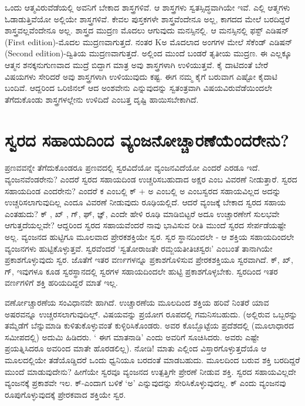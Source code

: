 ಒಂದು ಆತ್ಮವಿರುವೆಡೆಯಲ್ಲಿ ಅವನಿಗೆ ಬೇಕಾದ ಶಾಸ್ತ್ರಗಳಿವೆ. ಆ ಶಾಸ್ತ್ರಗಳು ಸ್ವತಸ್ಸಿದ್ಧವಾಗಿಯೇ ಇವೆ. ಎಲ್ಲಿ ಆತ್ಮಗಳು ಓಡಾಡುತ್ತಿವೆಯೋ ಅಲ್ಲಿಯೇ ಶಾಸ್ತ್ರಗಳಿವೆ. ಕೇವಲ ಪುಸ್ತಕಗಳೇ ಶಾಸ್ತ್ರವೆಂದೇನೂ ಅಲ್ಲ, ಕಾಗದದ ಮೇಲೆ ಬರದಿದ್ದರೆ ಶಾಸ್ತ್ರವಲ್ಲವೆಂದೇನೂ ಅಲ್ಲ. ಶಾಸ್ತ್ರದ ಮುದ್ರಣ ಮೊದಲು ಆಗುವುದು ಮನಸ್ಸಿನಲ್ಲಿ. ಆ ಮನಸ್ಸಿನಲ್ಲಿ ಫಸ್ಟ್  ಎಡಿಷನ್ (First edition)-ಮೊದಲ ಮುದ್ರಣವಾಗುತ್ತದೆ. ನಂತರ Kಅ ಮೊದಲಾದ ಅಂಗಗಳ ಮೇಲೆ ಸೆಕೆಂಡ್ ಎಡಿಷನ್ (Second edition)-ದ್ವಿತಿಯ ಮುದ್ರಣವಾಗುತ್ತದೆ. ಅಲ್ಲಿಂದ ಮುಂದೆ ಬಂಡರೆ ತೃತೀಯ ಮುದ್ರಣ. ಈ ಎಲ್ಲಕ್ಕೂ ಆತ್ಮನ ಶನಕ್ಕನುಗುಣವಾದ ಮುದ್ರೆ ಬಿದ್ದಾಗ ಮಾತ್ರ ಅವು ಶಾಸ್ತ್ರಗಳಾಗಿ ಉಳಿಯುತ್ತವೆ. ಕೈ ದಾಟಿದಂತೆ ಬೇರೆ ವಿಷಯಗಳು ಸೇರಿದರೆ ಅವು ಶಾಸ್ತ್ರಗಳಾಗಿ ಉಳಿಯುವುದು ಕಷ್ಟ. ಈಗ ನಮ್ಮ ಕೈಗೆ ಬರುವಾಗ ಎಷ್ಟೋ ಕೈದಾಟಿ ಬಂದಿವೆ. ಆದ್ದರಿಂದ ಒರಿಜಿನಲ್ ಆದ ಅಂಶವೇನು ಎನ್ನುವುದನ್ನು ಸ್ವತಂತ್ರವಾಗಿ ವಿಷಯವಿರುವೆಡೆಯಿಂದಲೇ ತೆಗೆದುಕೊಂಡು ಶಾಸ್ತ್ರಗಳಲ್ಲೇನು ಉಳಿದಿದೆ ಎಂಬತ್ತ ದೃಷ್ಟಿ ಹಾಯಿಸಬೇಕಾಗಿದೆ.

\section*{ಸ್ವರದ ಸಹಾಯದಿಂದ ವ್ಯಂಜನೋಚ್ಚಾರಣೆಯೆಂದರೇನು?}

ಪ್ರಣವವನ್ನೇ ತೆಗೆದುಕೊಂಡರೂ ಪ್ರಣವದಲ್ಲಿ ಸ್ವರವಿದೆಯೋ ವ್ಯಂಜನವಿದೆಯೋ ಎಂದರೆ ಎರಡೂ ಇದೆ. ವ್ಯಂಜನವೆಂಡರೇನು? ಎಂದರೆ ಸ್ವರದ ಸಹಾಯದಿಂಡ ಉಚ್ಚರಿಸಬಹುದಾದ ಅಕ್ಷರ ಎಂಬ ವಿವರಣೆ ನೀಡುತ್ತಾರೆ. ಸ್ವರದ ಸಹಾಯದಿಂಡ ಎಂದರೇನು? ಎಂದರೆ ಕ ಎಂಬಲ್ಲಿ ಕ್ + ಅ ಎಂಬಲ್ಲಿ ಅ ಎಂಬಸ್ವರದ ಸಹಾಯವಿಲ್ಲದ ಅದನ್ನು ಉಚ್ಚರಿಸಲಾಗುವುದಿಲ್ಲ ಎಂದೂ ವಿವರಣೆ ನೀಡುವುದು ರೂಢಿಯಲ್ಲಿದೆ. ಆದರೆ ವ್ಯಂಜಕ್ಕೆ  ಬೇಕಾದ ಸ್ವರದ ಸಹಾಯ ಎಂತಹುದು? ಕ್ , ಖ್ , ಗ್, ಘ್, ಜ್ಞ್, ಎಂದೇ ಹೇಳಿ ರೂಢಿ ಮಾಡಿಬಿಟ್ಟರೆ ಅದೂ ಉಚ್ಚಾರಣೇಗೆ ಸುಲಭವೇ ಆಗುತ್ತದೆಯಲ್ಲವೇ? ಆದ್ದರಿಂದ ಸ್ವರದ ಸಹಾಯವೆಂದರೆ ನಾವು ಭಾವಿಸುವ ರೀತಿ ಮುಂದೆ ಸ್ವರದ ಸೇರ್ಪಡೆಯಷ್ಟೇ ಅಲ್ಲ. ವ್ಯಂಜನದ ಹುಟ್ಟಿಗೂ ಮೂಲವಾದ ಪ್ರೇರಕಶಕ್ತಿಯೇ ಸ್ವರ. ಸ್ವರ ಸ್ಥಾನದಿಂದಲೇ - ಆ ಶಕ್ತಿಯ ಸಹಾಯದಿಂದಲೇ ವ್ಯಂಜನಗಳು ಹುಟ್ಟಿಕೊಳ್ಳುತ್ತವೆ. ಸ್ವರವೆಂದರೆ `ಸ್ವತೋರಾಜತೇ ರಮ್ಜಯತೀತಿಚಸ್ವರಃ' ಎಂಬಂತೆ ತಾನಾಗಿಯೇ ಪ್ರಕಾಶಗೊಳ್ಳುವುದು ಸ್ವರ. ಜೊತೆಗೆ ಇತರ ವರ್ಣಗಳನ್ನೂ ಪ್ರಕಾಶಗೊಳಿಸುವ ಪ್ರೇರಕಶಕ್ತಿಯೂ ಸ್ವರವಾಗಿದೆ. ಕ್, ಖ್, ಗ್, ಇವುಗಳೂ ಕೂಡ ಸ್ವರಸ್ಥಾನದಲ್ಲಿ ಸ್ವರಗಳ ಸಹಾಯದಿಂದಲೇ ಹುಟ್ಟಿ ಪ್ರಕಾಶಗೊಳ್ಳಬೇಕು. ಸ್ವರದಿಂದ ಇತರ ವರ್ಣಗಳಿಗೆ ಶಕ್ತಿ ಹರಿಯದಿದ್ದರೆ ಮಾತೆ ಇಲ್ಲ.

ವರ್ಣೋಚ್ಚಾರಣೆಯ ಸಂವಿಧಾನವೇ ಹಾಗಿದೆ.  ಉಚ್ಚಾರಣೆಯ ಮೂಲದಿಂದ ಶಕ್ತಿಯ ಹರಿವೆ ನಿಂತರೆ ಯಾವ ಅಷರವನ್ನೂ ಉಚ್ಚರಸಲಾಗುವುದಿಲ್ಲ್. ವಿಷಯವನ್ನು ಪ್ರಯೋಗ ರೂಪದಲ್ಲಿ ಗಮನಿಸಬಹುದು. (ಅಲ್ಲಿರುವ ಒಬ್ಬರನ್ನು ತಮ್ಮೆಡೆಗೆ ಬೆನ್ನುಮಾಡಿ ಕುಳಿತುಕೊಳ್ಳುವಂತೆ ಕುಳ್ಳಿರಿಸಿಕೊಂಡರು. ಅವರ ಕೊಬ್ಬೊಟ್ಟೆಯ ಪ್ರದೆಶದಲ್ಲಿ (ಮೂಲಾಧಾರದ ಸಮೀಪದಲ್ಲಿ) ಅದುಮಿ ಹಿಡಿದರು. ` ಈಗ ಮಾತನಾಡಿ' ಎಂದು ಅವರಿಗೆ ಸೂಚಿಸಿದರು. ಅವರು ಎಷ್ಟೇ ಪ್ರಯತ್ನಿಸಿದರೂ ಅವರಿಂದ ಮಾತೇ ಹೊರಡಲಿಲ್ಲ).  ನೋಡಿ! ಮಾತು ಎಲ್ಲಿಂದ ವಿಸ್ತಾರಗೊಳ್ಳುತ್ತದೆಯೊ ಆ ಮೂಲದಲ್ಲಿಯೇ ತಡೆಯೊಡ್ಡಿದರೆ ಒಂದು ಧ್ವನಿಯೂ ಬರದಂತೆ ಮಾಡಬಹುದು. ಮೂಲದಿಂದ ಬರುವ ಶಕ್ತಿ ಬರದಿದ್ದರೆ ಮುಂದೆ ಮಾಡುವುದೇನು? ಹೀಗೆಯೇ ಸ್ವರವೂ ವ್ಯಂಜನದ ಉತ್ಪತ್ತಿಗೇ ಪ್ರೇರಣೆ ನೀಡುವ ಶಕ್ತಿ. ಸ್ವರದ ಸಹಾಯವಿಲ್ಲದೇ ವ್ಯಂಜನಕ್ಕೆ  ಪ್ರಕಾಶವೇ ಇಲ. ಕ್-ಎಂದಾಗ ಬಳಿಕೆ `ಅ' ಎನ್ನುವುದನ್ನು ಸೇರಿಸಿಕೊಳ್ಳುವುದಲ್ಲ. ಕ್ ಎಂದು ವ್ಯಂಜನವು ರೂಪುಗೊಳ್ಳುವುದಕ್ಕೆ  ಪ್ರೇರಕವಾದ ಶಕ್ತಿಯೇ ಸ್ವರ.

